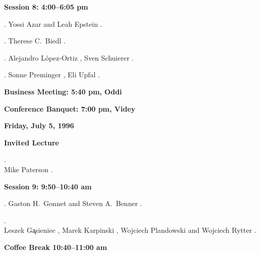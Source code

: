 {\bf Session 8:  4:00--6:05 pm}
\begin{session}
\item[4:00]
.
		{\who Yossi Azar and Leah Epstein} .

\item[4:25]
.
		{\who Therese C.\ Biedl} .

\item[4:50]
.
		{\who Alejandro L\'opez-Ortiz} , {\who Sven Schuierer} .

\item[5:15]
.
		{\who Sonne Preminger} , {\who Eli Upfal} .
\end{session}

{\bf Business Meeting: 5:40 pm, Oddi}

{\bf Conference Banquet:  7:00 pm, Videy}


\vspace{1.5em}
\parskip=4pt

{\normalsize\bf Friday, July 5, 1996}

{\bf Invited Lecture}
\begin{session}
\item[9:00]
. \\
{\who Mike Paterson}
.
\end{session}


{\bf Session 9:  9:50--10:40 am}
\begin{session}
\item[9:50]
.
		{\who Gaston H.\ Gonnet and Steven A.\ Benner} .

\item[10:15]
. \\
		{\who Leszek G{\c a}sieniec} , {\who Marek Karpinski} , 
		{\who Wojciech Plandowski and Wojciech Rytter} .

\end{session}

{\bf Coffee Break 10:40--11:00 am}


